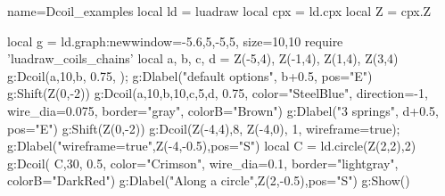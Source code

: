 \begin{luadraw}{name=Dcoil_examples}
local ld = luadraw
local cpx = ld.cpx
local Z = cpx.Z

local g = ld.graph:new{window={-5.6,5,-5,5}, size={10,10}}
require 'luadraw_coils_chains'
local a, b, c, d = Z(-5,4), Z(-1,4), Z(1,4), Z(3,4)
g:Dcoil({a,10,b}, 0.75, {}); g:Dlabel("default options", b+0.5, {pos="E"})
g:Shift(Z(0,-2))
g:Dcoil({a,10,b,10,c,5,d}, 0.75, {color="SteelBlue", direction=-1, wire_dia=0.075, 
    border="gray", colorB="Brown"})
g:Dlabel("3 springs", d+0.5, {pos="E"})
g:Shift(Z(0,-2))
g:Dcoil({Z(-4,4),8, Z(-4,0)}, 1, {wireframe=true}); g:Dlabel("wireframe=true",Z(-4,-0.5),{pos="S"})
local C = ld.circle(Z(2,2),2)
g:Dcoil( {C,30}, 0.5, {color="Crimson", wire_dia=0.1, border="lightgray", colorB="DarkRed"})
g:Dlabel("Along a circle",Z(2,-0.5),{pos="S"})
g:Show()
\end{luadraw}
